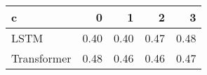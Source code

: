 \begin{tabular}{lrrrr}
\toprule
c &    0 &    1 &    2 &    3 \\
\midrule
LSTM        & 0.40 & 0.40 & 0.47 & 0.48 \\
Transformer & 0.48 & 0.46 & 0.46 & 0.47 \\
\bottomrule
\end{tabular}

